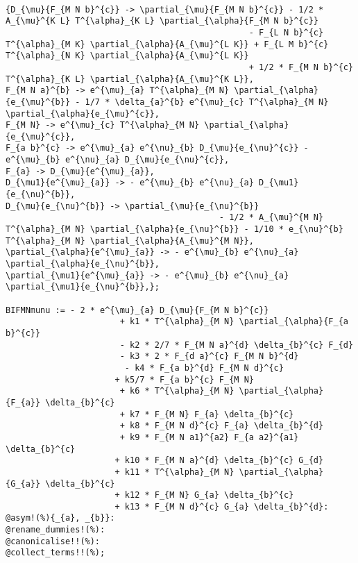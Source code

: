 \documentclass[11pt]{article}
\begin{document}
\\
{\color[named]{Blue}\begin{verbatim}
{D_{\mu}{F_{M N b}^{c}} -> \partial_{\mu}{F_{M N b}^{c}} - 1/2 * A_{\mu}^{K L} T^{\alpha}_{K L} \partial_{\alpha}{F_{M N b}^{c}}
                                                 - F_{L N b}^{c} T^{\alpha}_{M K} \partial_{\alpha}{A_{\mu}^{L K}} + F_{L M b}^{c} T^{\alpha}_{N K} \partial_{\alpha}{A_{\mu}^{L K}}
                                                 + 1/2 * F_{M N b}^{c} T^{\alpha}_{K L} \partial_{\alpha}{A_{\mu}^{K L}},
F_{M N a}^{b} -> e^{\mu}_{a} T^{\alpha}_{M N} \partial_{\alpha}{e_{\mu}^{b}} - 1/7 * \delta_{a}^{b} e^{\mu}_{c} T^{\alpha}_{M N} \partial_{\alpha}{e_{\mu}^{c}},
F_{M N} -> e^{\mu}_{c} T^{\alpha}_{M N} \partial_{\alpha}{e_{\mu}^{c}},
F_{a b}^{c} -> e^{\mu}_{a} e^{\nu}_{b} D_{\mu}{e_{\nu}^{c}} - e^{\mu}_{b} e^{\nu}_{a} D_{\mu}{e_{\nu}^{c}},
F_{a} -> D_{\mu}{e^{\mu}_{a}},
D_{\mu1}{e^{\mu}_{a}} -> - e^{\mu}_{b} e^{\nu}_{a} D_{\mu1}{e_{\nu}^{b}},
D_{\mu}{e_{\nu}^{b}} -> \partial_{\mu}{e_{\nu}^{b}} 
                                           - 1/2 * A_{\mu}^{M N} T^{\alpha}_{M N} \partial_{\alpha}{e_{\nu}^{b}} - 1/10 * e_{\nu}^{b} T^{\alpha}_{M N} \partial_{\alpha}{A_{\mu}^{M N}},
\partial_{\alpha}{e^{\mu}_{a}} -> - e^{\mu}_{b} e^{\nu}_{a} \partial_{\alpha}{e_{\nu}^{b}},
\partial_{\mu1}{e^{\mu}_{a}} -> - e^{\mu}_{b} e^{\nu}_{a} \partial_{\mu1}{e_{\nu}^{b}},};

BIFMNmunu := - 2 * e^{\mu}_{a} D_{\mu}{F_{M N b}^{c}}
                       + k1 * T^{\alpha}_{M N} \partial_{\alpha}{F_{a b}^{c}}
                       - k2 * 2/7 * F_{M N a}^{d} \delta_{b}^{c} F_{d}
                       - k3 * 2 * F_{d a}^{c} F_{M N b}^{d}
                        - k4 * F_{a b}^{d} F_{M N d}^{c}
                      + k5/7 * F_{a b}^{c} F_{M N}
                       + k6 * T^{\alpha}_{M N} \partial_{\alpha}{F_{a}} \delta_{b}^{c}
                       + k7 * F_{M N} F_{a} \delta_{b}^{c}
                       + k8 * F_{M N d}^{c} F_{a} \delta_{b}^{d}
                       + k9 * F_{M N a1}^{a2} F_{a a2}^{a1} \delta_{b}^{c}
                      + k10 * F_{M N a}^{d} \delta_{b}^{c} G_{d}
                      + k11 * T^{\alpha}_{M N} \partial_{\alpha}{G_{a}} \delta_{b}^{c}
                      + k12 * F_{M N} G_{a} \delta_{b}^{c}
                      + k13 * F_{M N d}^{c} G_{a} \delta_{b}^{d}:
@asym!(%){_{a}, _{b}}:
@rename_dummies!(%):
@canonicalise!!(%):
@collect_terms!!(%);
\end{verbatim}}
\end{document}
